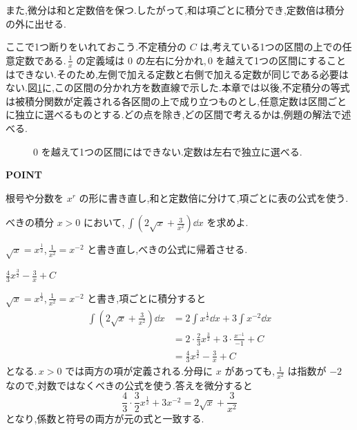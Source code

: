 また,微分は和と定数倍を保つ.したがって,和は項ごとに積分でき,定数倍は積分の外に出せる.

ここで1つ断りをいれておこう.不定積分の $C$ は,考えている1つの区間の上での任意定数である.\,$\frac1x$ の定義域は $0$ の左右に分かれ,\,$0$ を越えて1つの区間にすることはできない.そのため,左側で加える定数と右側で加える定数が同じである必要はない.図\ref{図:対数の区間}に,この区間の分かれ方を数直線で示した.本章では以後,不定積分の等式は被積分関数が定義される各区間の上で成り立つものとし,任意定数は区間ごとに独立に選べるものとする.どの点を除き,どの区間で考えるかは,例題の解法で述べる.

\begin{figure}[htbp]
 \centering
 \caption{$0$ を越えて1つの区間にはできない.定数は左右で独立に選べる.}
 \label{図:対数の区間}
\end{figure}

\begin{bookpoint}
\textbf{POINT}\par
根号や分数を $x^r$ の形に書き直し,和と定数倍に分けて,項ごとに表の公式を使う.
\end{bookpoint}

\begin{example}{べきの積分}
$x>0$ において,\,$\int\left(2\sqrt{x}+\frac3{x^2}\right)\dd x$ を求めよ.
\end{example}

$\sqrt{x}=x^{\frac12}$,\,$\frac1{x^2}=x^{-2}$ と書き直し,べきの公式に帰着させる.

$\frac43x^{\frac32}-\frac3x+C$

$\sqrt{x}=x^{\frac12}$,\,$\frac1{x^2}=x^{-2}$ と書き,項ごとに積分すると
\begin{align*}
 \int\left(2\sqrt{x}+\frac3{x^2}\right)\dd x
 &=2\int x^{\frac12}\dd x+3\int x^{-2}\dd x\\
 &=2\cdot\frac23x^{\frac32}+3\cdot\frac{x^{-1}}{-1}+C\\
 &=\frac43x^{\frac32}-\frac3x+C
\end{align*}
となる.\,$x>0$ では両方の項が定義される.分母に $x$ があっても,\,$\frac1{x^2}$ は指数が $-2$ なので,対数ではなくべきの公式を使う.答えを微分すると
\[
 \frac43\cdot\frac32x^{\frac12}+3x^{-2}=2\sqrt{x}+\frac3{x^2}
\]
となり,係数と符号の両方が元の式と一致する.

